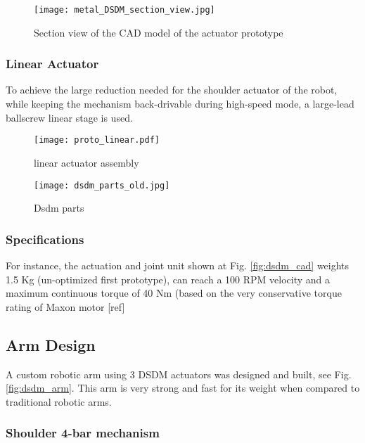 \begin{figure}[htp]
	\centering
		\texttt{[image: metal\_DSDM\_section\_view.jpg]}
	\caption{Section view of the CAD model of the actuator prototype} %
	\label{fig:dsdm_section}
\end{figure}


\subsubsection{Linear Actuator}

To achieve the large reduction needed for the shoulder actuator of the robot, while keeping the mechanism back-drivable during high-speed mode, a large-lead ballscrew linear stage is used. 

\begin{figure}[htp]
	\centering
		\texttt{[image: proto\_linear.pdf]}
	\caption{linear actuator assembly} 
	\label{fig:linact}
\end{figure}

\begin{figure}[htbp]
	\centering
		\texttt{[image: dsdm\_parts\_old.jpg]}
	\caption{Dsdm parts}
	\label{fig:dsdm_parts_old}
\end{figure}


\subsubsection{Specifications}

For instance, the actuation and joint unit shown at Fig. \ref{fig:dsdm_cad} weights 1.5 Kg (un-optimized first prototype), can reach a 100 RPM velocity and a maximum continuous torque of 40 Nm (based on the very conservative torque rating of Maxon motor [ref] 


\subsection{Arm Design}
\label{sec:DSDMArm}

A custom robotic arm using 3 DSDM actuators was designed and built, see Fig. \ref{fig:dsdm_arm}. This arm is very strong and fast for its weight when compared to traditional robotic arms. 


\subsubsection{Shoulder 4-bar mechanism}

